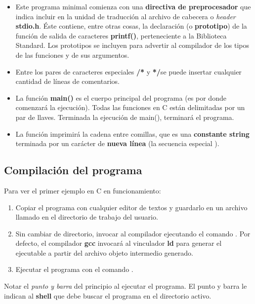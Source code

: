 \begin{itemize}
\item Este programa minimal comienza con una \textbf{directiva de preprocesador} que indica incluir en la unidad de traducción al
archivo de cabecera o \textit{header} \textbf{stdio.h}. Éste contiene, entre otras
cosas, la declaración (o \textbf{prototipo}) de la función de
salida de caracteres \textbf{printf()}, perteneciente a la Biblioteca Standard. Los prototipos se incluyen para
advertir al compilador de los tipos de las funciones y de sus
argumentos. 
\item Entre los pares de caracteres especiales \textbf{/*} y \textbf{*/}se puede insertar cualquier cantidad de líneas de comentarios. 
\item La función \textbf{main()} es el cuerpo principal del programa
(es por donde comenzará la ejecución). Todas las funciones en C están delimitadas por un par de llaves. Terminada la ejecución de
main(), terminará el programa. 
\item La función  imprimirá la cadena entre comillas, que es
una \textbf{constante string} terminada por un carácter de
\textbf{nueva línea} (la secuencia especial \quotes{\code{\\n}}). 
\end{itemize}

\subsection{Compilación del programa}
Para ver el primer ejemplo en C en funcionamiento:

\begin{enumerate}
	\item Copiar el programa con cualquier editor de textos y guardarlo en un archivo llamado  en el directorio de trabajo del usuario.
	\item Sin cambiar de directorio, invocar al compilador ejecutando el comando . Por defecto, el compilador \textbf{gcc} invocará al vinculador \textbf{ld} para generar el ejecutable a partir del archivo objeto intermedio generado. 
	\item Ejecutar el programa con el comando . 
\end{enumerate}

Notar el \textit{punto y barra} del principio al ejecutar el programa. El punto y barra le indican al \textbf{shell} que debe buscar el programa en el directorio activo.

